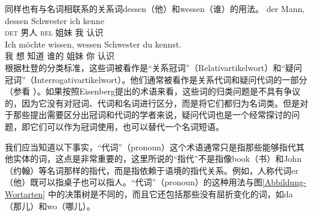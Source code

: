 同样也有与名词相联系的关系词dessen（他）和wessen（谁）的用法。
\eal
\ex 
\gll der          Mann, dessen Schwester ich kenne\\
     \textsc{det} 男人  \textsc{rel} 姐妹 我 认识\\
\ex 
\gll Ich möchte wissen, wessen Schwester du kennst.\\
	 我 想 知道 谁的 姐妹 你 认识\\
\zl
根据杜登的分类标准，这些词被看作是“关系冠词”（Relativartikelwort）和“疑问冠词”（Interrogativartikelwort）。他们通常被看作是关系代词和疑问代词的一部分（参看 ）。如果按照Eisenberg提出的术语来看，这些词的归类问题是不具有争议的，因为它没有对冠词、代词和名词进行区分，而是将它们都归为名词类。但是对于那些提出需要区分出冠词和代词的学者来说，疑问代词也是一个经常探讨的问题，即它们可以作为冠词使用，也可以替代一个名词短语。

我们应当知道以下事实，“代词”（pronoun）这个术语通常只是指那些能够指代其他实体的词，这点是非常重要的，这里所说的“指代”不是指像book（书）和John（约翰）等名词那样的指代，而是指依赖于语境的指代关系。例如，人称代词er（他）既可以指桌子也可以指人。“代词”（pronoun）的这种用法与图\ref{Abbildung-Wortarten}
中的决策树是不同的，而且它还包括那些没有屈折变化的词，如da（那儿）和wo（哪儿）。

